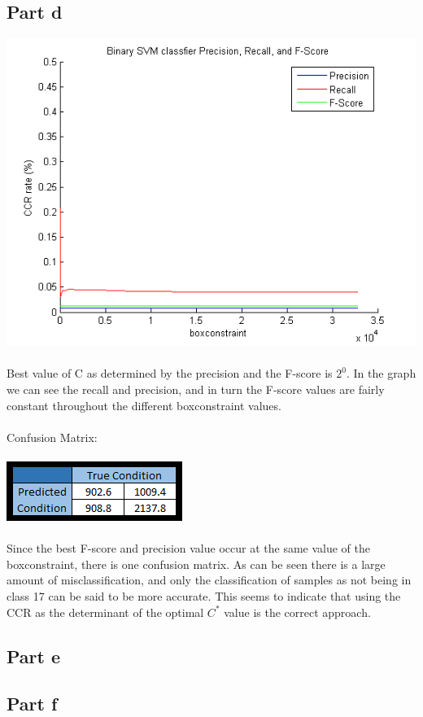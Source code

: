 \documentclass[paper=a4, fontsize=11pt]{scrartcl} %
\numberwithin{equation}{section} %
\numberwithin{figure}{section} %
\numberwithin{table}{section} %
\begin{document}
	\subsection{Part d}
	\includegraphics[scale=0.8]{part_d_CV_CCR}
	\\\\
	Best value of C as determined by the precision and the F-score is $2^0$. In the graph we can see the recall and precision, and in turn the F-score values are fairly constant throughout the different boxconstraint values.
	\\\\
	Confusion Matrix:
	\\\\
	\hspace*{4cm}\includegraphics{part_d_confusion_matrix}
	\\\\
	Since the best F-score and precision value occur at the same value of the boxconstraint, there is one confusion matrix. As can be seen there is a large amount of misclassification, and only the classification of samples as not being in class 17 can be said to be more accurate. This seems to indicate that using the CCR as the determinant of the optimal $C^*$ value is the correct approach.
	
	\newpage
	
	\subsection{Part e}
	
	\subsection{Part f}
	
\end{document}
